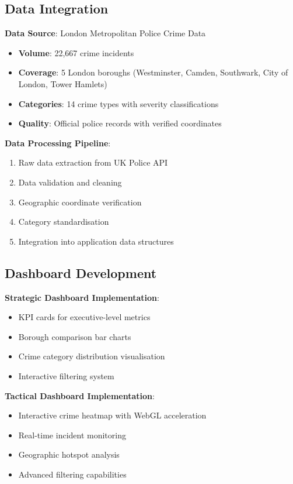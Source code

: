 \documentclass[12pt,a4paper]{article}
\begin{document}
\subsection{Data Integration}

\textbf{Data Source}: London Metropolitan Police Crime Data
\begin{itemize}
    \item \textbf{Volume}: 22,667 crime incidents
    \item \textbf{Coverage}: 5 London boroughs (Westminster, Camden, Southwark, City of London, Tower Hamlets)
    \item \textbf{Categories}: 14 crime types with severity classifications
    \item \textbf{Quality}: Official police records with verified coordinates
\end{itemize}

\textbf{Data Processing Pipeline}:
\begin{enumerate}
    \item Raw data extraction from UK Police API
    \item Data validation and cleaning
    \item Geographic coordinate verification
    \item Category standardisation
    \item Integration into application data structures
\end{enumerate}

\subsection{Dashboard Development}

\textbf{Strategic Dashboard Implementation}:
\begin{itemize}
    \item KPI cards for executive-level metrics
    \item Borough comparison bar charts
    \item Crime category distribution visualisation
    \item Interactive filtering system
\end{itemize}

\textbf{Tactical Dashboard Implementation}:
\begin{itemize}
    \item Interactive crime heatmap with WebGL acceleration
    \item Real-time incident monitoring
    \item Geographic hotspot analysis
    \item Advanced filtering capabilities
\end{itemize}
\end{document}
